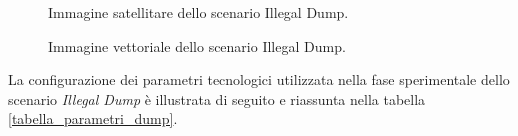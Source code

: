 \begin{figure}[H] 
    \captionsetup{justification=centering, margin=2cm, font=footnotesize}
    \begin{center}
    \end{center}
    \caption{Immagine satellitare dello scenario Illegal Dump.}
    \label{dump_map}
\end{figure}

\begin{figure}[H] 
    \captionsetup{justification=centering, margin=2cm, font=footnotesize}
    \begin{center}
    \end{center}
    \caption{Immagine vettoriale dello scenario Illegal Dump.}
    \label{dump_scenario}
\end{figure}

La configurazione dei parametri tecnologici utilizzata nella fase sperimentale dello scenario \textit{Illegal Dump} è illustrata di seguito e riassunta nella tabella \ref{tabella_parametri_dump}.

